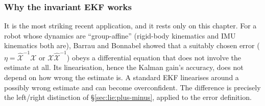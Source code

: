 \subsubsection{Why the invariant EKF works}
It is the most striking recent application, and it rests only on this chapter. For a robot whose dynamics are ``group-affine'' (rigid-body kinematics and IMU kinematics both are), Barrau and Bonnabel showed that a suitably chosen error ($\eta=\hat{\mathcal X}^{-1}\mathcal X$ or $\mathcal X\hat{\mathcal X}^{-1}$) obeys a differential equation that does not involve the estimate at all. Its linearisation, hence the Kalman gain's accuracy, does not depend on how wrong the estimate is. A standard EKF linearises around a possibly wrong estimate and can become overconfident. The difference is precisely the left/right distinction of \S\ref{sec:lie:plus-minus}, applied to the error definition.
